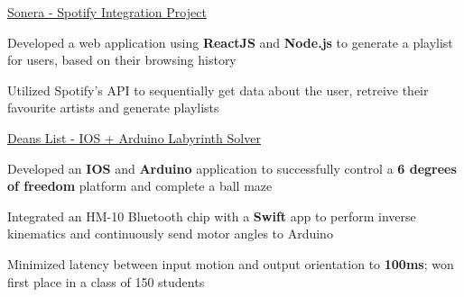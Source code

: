 \begin{siderulesProj}
\par\addvspace{-1.2ex}
\begin{cventriesproject}
  \cventryproject
    {\href{https://github.com/lance-gomes/Sonera}{Sonera - Spotify Integration Project}}
    {
      \begin{cvskillitems}
        \item {Developed a web application using \textbf{ReactJS} and \textbf{Node.js} to generate a playlist for users, based on their browsing history}
        \item {Utilized Spotify's API to sequentially get data about the user, retreive their favourite artists and generate playlists}
      \end{cvskillitems}
    }
  \cventryproject
    {\href{https://github.com/lance-gomes/ME-380}{Deans List - IOS + Arduino Labyrinth Solver}}
    {
      \begin{cvskillitems}
        \item {Developed an \textbf{IOS} and \textbf{Arduino} application to successfully control a \textbf{6 degrees of freedom} platform and complete a ball maze}
        \item {Integrated an HM-10 Bluetooth chip with a \textbf{Swift} app to perform inverse kinematics and continuously send motor angles to Arduino}
        \item {Minimized latency between input motion and output orientation to \textbf{100ms}; won first place in a class of 150 students}
      \end{cvskillitems}
    }
\end{cventriesproject}
\end{siderulesProj}

